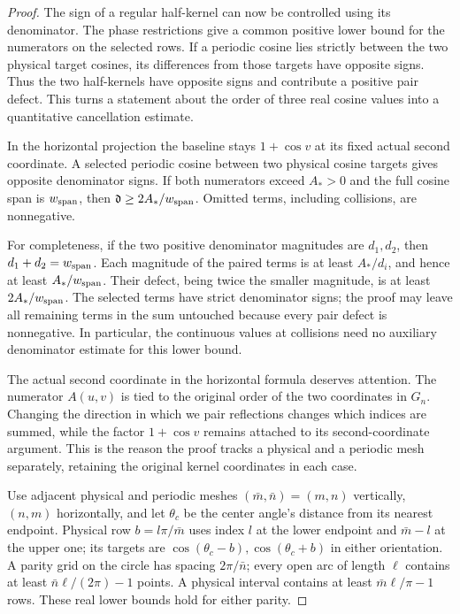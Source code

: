 \begin{proof}
The sign of a regular half-kernel can now be controlled using its
denominator.  The phase restrictions give a common positive lower
bound for the numerators on the selected rows.  If a periodic cosine
lies strictly between the two physical target cosines, its
differences from those targets have opposite signs.  Thus the two
half-kernels have opposite signs and contribute a positive pair
defect.  This turns a statement about the order of three real cosine
values into a quantitative cancellation estimate.

In the horizontal projection the baseline stays $1+\cos v$ at its
fixed actual second coordinate.  A selected periodic cosine between
two physical cosine targets gives opposite denominator signs.  If both
numerators exceed $A_*>0$ and the full cosine span is $w_{\rm span}$, then
$\mathfrak d\geq2A_*/w_{\rm span}$.  Omitted terms, including collisions, are nonnegative.

For completeness, if the two positive denominator magnitudes are
$d_1,d_2$, then $d_1+d_2=w_{\rm span}$.  Each magnitude of the paired terms
is at least $A_*/d_i$, and hence at least $A_*/w_{\rm span}$.  Their defect,
being twice the smaller magnitude, is at least $2A_*/w_{\rm span}$.
The selected terms have strict denominator signs; the proof may leave
all remaining terms in the sum untouched because every pair defect
is nonnegative.  In particular, the continuous values at collisions
need no auxiliary denominator estimate for this lower bound.

The actual second coordinate in the horizontal formula deserves
attention.  The numerator $A(u,v)$ is tied to the original order of
the two coordinates in $G_n$.  Changing the direction in which we
pair reflections changes which indices are summed, while the factor
$1+\cos v$ remains attached to its second-coordinate argument.
This is the reason the proof tracks a physical and a periodic mesh
separately, retaining the original kernel coordinates in each case.

Use adjacent physical and periodic meshes $(\bar{m},\bar{n})=(m,n)$ vertically,
$(n,m)$ horizontally, and let $\theta_c$ be the center angle's distance
from its nearest endpoint.  Physical row $b=l\pi/\bar{m}$ uses index $l$
at the lower endpoint and $\bar{m}-l$ at the upper one; its targets are
$\cos(\theta_c-b),\cos(\theta_c+b)$ in either orientation.  A parity grid
on the circle has spacing $2\pi/\bar{n}$; every open arc of length $\ell$
contains at least $\bar{n}\ell/(2\pi)-1$ points.  A physical interval contains
at least $\bar{m}\ell/\pi-1$ rows.  These real lower bounds hold for either parity.


\end{proof}
